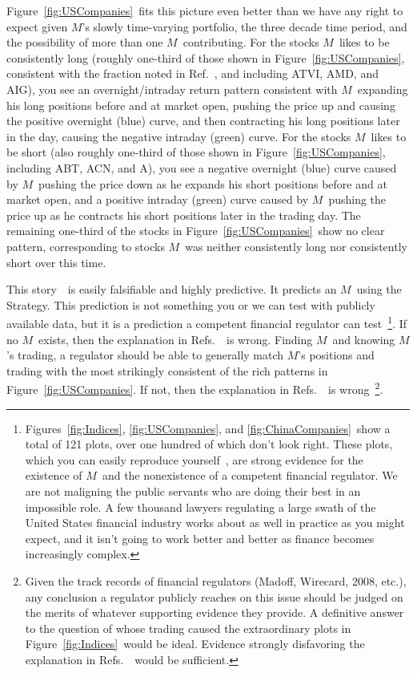 \documentclass[twocolumn,twoside,prd,floatfix,letterpaper]{revtex4}
\def \FigMain {Figure~\ref{fig:Indices}}
\def \FigUSCompanies {Figure~\ref{fig:USCompanies}}
\def \FigsWorldUSChina {Figures~\ref{fig:Indices}, \ref{fig:USCompanies}, and \ref{fig:ChinaCompanies}}
\def \theExplanation {\cite{knuteson2016,knuteson2018,knuteson2019}}
\def \RefsTheExplanation {Refs.~\theExplanation}
\def \M {\ensuremath{M}}
\begin{document}
\FigUSCompanies\ fits this picture even better than we have any right to expect given \M's slowly time-varying portfolio, the three decade time period, and the possibility of more than one \M\ contributing.  For the stocks \M\ likes to be consistently long (roughly one-third of those shown in \FigUSCompanies, consistent with the fraction noted in Ref.~\cite{lachance2015night}, and including ATVI, AMD, and AIG), you see an overnight/intraday return pattern consistent with \M\ expanding his long positions before and at market open, pushing the price up and causing the positive overnight (blue) curve, and then contracting his long positions later in the day, causing the negative intraday (green) curve.  For the stocks \M\ likes to be short (also roughly one-third of those shown in \FigUSCompanies, including ABT, ACN, and A), you see a negative overnight (blue) curve caused by \M\ pushing the price down as he expands his short positions before and at market open, and a positive intraday (green) curve caused by \M\ pushing the price up as he contracts his short positions later in the trading day.  The remaining one-third of the stocks in \FigUSCompanies\ show no clear pattern, corresponding to stocks \M\ was neither consistently long nor consistently short over this time.

This story~\theExplanation\ is easily falsifiable and highly predictive.  It predicts an \M\ using the Strategy.  This prediction is not something you or we can test with publicly available data, but it is a prediction a competent financial regulator can test~\footnote{\FigsWorldUSChina\ show a total of 121 plots, over one hundred of which don't look right.  These plots, which you can easily reproduce yourself~\cite{yahooFinance,thisArticleWebpage}, are strong evidence for the existence of \M\ and the nonexistence of a competent financial regulator.  We are not maligning the public servants who are doing their best in an impossible role.  A few thousand lawyers regulating a large swath of the United States financial industry works about as well in practice as you might expect, and it isn't going to work better and better as finance becomes increasingly complex.}.  If no \M\ exists, then the explanation in \RefsTheExplanation\ is wrong.  Finding \M\ and knowing \M's trading, a regulator should be able to generally match \M's positions and trading with the most strikingly consistent of the rich patterns in \FigUSCompanies.  If not, then the explanation in \RefsTheExplanation\ is wrong~\footnote{Given the track records of financial regulators (Madoff, Wirecard, 2008, etc.), any conclusion a regulator publicly reaches on this issue should be judged on the merits of whatever supporting evidence they provide.  A definitive answer to the question of whose trading caused the extraordinary plots in \FigMain\ would be ideal.  Evidence strongly disfavoring the explanation in \RefsTheExplanation\ would be sufficient.}.
\end{document}
